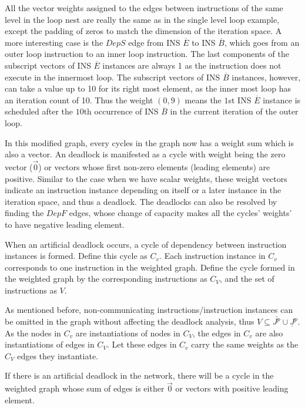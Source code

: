 All the vector weights assigned to the edges between instructions of
the same level in the loop nest are really the same as in the single level loop
example, except the padding of zeros to match the dimension of the iteration space. A more interesting case is the $DepS$ edge from INS $\overline{E}$ to INS $\overline{B}$, which goes from an outer loop instruction to an inner loop instruction. 
The last components of the subscript vectors of INS $\overline{E}$ instances are always 1
as the instruction does not execute in the innermost loop. The subscript vectors of INS $\overline{B}$ instances, however, can take a value up to 10 for its right most element, as the inner most loop has an iteration count of 10. Thus the weight $(0,9)$
means the $1$st INS $\overline{E}$ instance is scheduled after the $10$th occurrence of INS $\overline{B}$ in the current iteration of the outer loop.

In this modified graph, 
every cycles in the graph now has a weight sum which is also a vector. 
An deadlock is manifested as a cycle with weight being the zero vector ($\vec{0}$)
or vectors whose first non-zero elements (leading elements) are positive.
Similar to the case when we have scalar
weights, these weight vectors 
indicate an instruction instance depending on itself or a later instance in the iteration space, and thus a deadlock. The deadlocks can also be
resolved by finding the $DepF$ edges, whose change of capacity makes
all the cycles' weights' to have negative  leading element. 


\begin{definition}
When an artificial deadlock occurs, a cycle of dependency between instruction instances is formed. Define this cycle as $C_v$. Each instruction instance in $C_v$ corresponds to one instruction in the weighted graph. Define the cycle formed in the weighted graph by the corresponding instructions as $C_V$, and the set of instructions
as $V$. 
\end{definition}

As mentioned before, non-communicating instructions/instruction instances can be omitted in the graph without affecting the deadlock analysis, thus $V \subseteq \bar{J^p} \cup \underline{J}^p$. As the nodes in $C_v$ are instantiations of nodes in $C_V$, the edges in $C_v$ are also
instantiations of edges in $C_V$. Let these edges in $C_v$ carry the same weights as the $C_V$ edges they instantiate.

\begin{lemma}
\label{deadlock2cycle}
If there is an artificial deadlock in the network, there will be a cycle in
the weighted graph whose sum of edges
is either $\vec{0}$ or vectors with positive leading element. 
\end{lemma}

